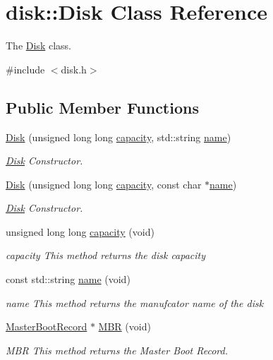 \hypertarget{classdisk_1_1_disk}{}\section{disk\+:\+:Disk Class Reference}
\label{classdisk_1_1_disk}


The \mbox{\hyperlink{classdisk_1_1_disk}{Disk}} class.  




{\ttfamily \#include $<$disk.\+h$>$}

\subsection*{Public Member Functions}
\begin{DoxyCompactItemize}
\item 
\mbox{\hyperlink{classdisk_1_1_disk_a1531676df8b095dc6e818458aebf9dee}{Disk}} (unsigned long long \mbox{\hyperlink{classdisk_1_1_disk_a4f0d7b0ab94fb0ed0a58bb19ce85729f}{capacity}}, std\+::string \mbox{\hyperlink{classdisk_1_1_disk_a889c305501805431f1189f179d8281ca}{name}})
\begin{DoxyCompactList}\small\item\em \mbox{\hyperlink{classdisk_1_1_disk}{Disk}} Constructor. \end{DoxyCompactList}\item 
\mbox{\hyperlink{classdisk_1_1_disk_ad7164897c3af79602e86463065550754}{Disk}} (unsigned long long \mbox{\hyperlink{classdisk_1_1_disk_a4f0d7b0ab94fb0ed0a58bb19ce85729f}{capacity}}, const char $\ast$\mbox{\hyperlink{classdisk_1_1_disk_a889c305501805431f1189f179d8281ca}{name}})
\begin{DoxyCompactList}\small\item\em \mbox{\hyperlink{classdisk_1_1_disk}{Disk}} Constructor. \end{DoxyCompactList}\item 
unsigned long long \mbox{\hyperlink{classdisk_1_1_disk_a4f0d7b0ab94fb0ed0a58bb19ce85729f}{capacity}} (void)
\begin{DoxyCompactList}\small\item\em capacity This method returns the disk capacity \end{DoxyCompactList}\item 
const std\+::string \mbox{\hyperlink{classdisk_1_1_disk_a889c305501805431f1189f179d8281ca}{name}} (void)
\begin{DoxyCompactList}\small\item\em name This method returns the manufcator name of the disk \end{DoxyCompactList}\item 
\mbox{\hyperlink{classdisk_1_1_master_boot_record}{Master\+Boot\+Record}} $\ast$ \mbox{\hyperlink{classdisk_1_1_disk_ac3ed02b2b44d2d15039d3616238c0985}{M\+BR}} (void)
\begin{DoxyCompactList}\small\item\em M\+BR This method returns the Master Boot Record. \end{DoxyCompactList}\end{DoxyCompactItemize}
